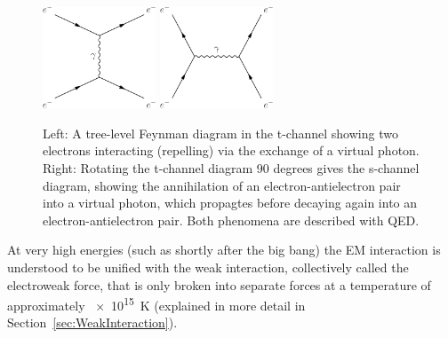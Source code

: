 \begin{figure}[H]
    \centering
    \vspace{0.05\textwidth}
    \includegraphics[width=0.3\textwidth]{Images/Theory/QEDInteraction.pdf}\hspace{0.1\textwidth}
    \includegraphics[width=0.3\textwidth]{Images/Theory/QED_s_channel.pdf}\vspace{0.05\textwidth}
    \caption{Left: A tree-level Feynman diagram in the t-channel showing two electrons interacting (repelling) via the exchange of a virtual photon. Right: Rotating the t-channel diagram 90 degrees gives the s-channel diagram, showing the annihilation of an electron-antielectron pair into a virtual photon, which propagtes before decaying again into an electron-antielectron pair. Both phenomena are described with QED.}
    \label{fig:QEDFeynmanDiagram}
\end{figure}
At very high energies (such as shortly after the big bang) the EM interaction is understood to be unified with the weak interaction, collectively called the electroweak force, that is only broken into separate forces at a temperature of approximately \SI{e15}{K} (explained in more detail in Section~\ref{sec:WeakInteraction}).